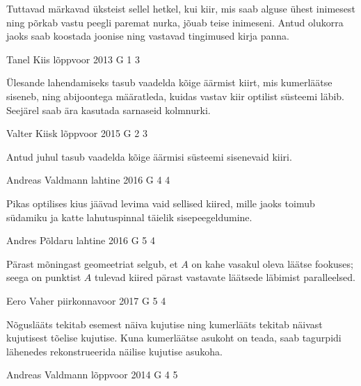 \documentclass[11pt, twoside]{article}
\begin{document}
{{\ifHint
Tuttavad märkavad üksteist sellel hetkel, kui kiir, mis saab alguse ühest inimesest ning põrkab vastu peegli paremat nurka, jõuab teise inimeseni. Antud olukorra jaoks saab koostada joonise ning vastavad tingimused kirja panna.
\fi
}

{Tanel Kiis} %
{lõppvoor} %
{2013} %
{G 1} %
{3} %
{

\ifHint
Ülesande lahendamiseks tasub vaadelda kõige äärmist kiirt, mis kumerläätse siseneb, ning abijoontega määratleda, kuidas vastav kiir optilist süsteemi läbib. Seejärel saab ära kasutada sarnaseid kolmnurki.
\fi
}

{Valter Kiisk} %
{lõppvoor} %
{2015} %
{G 2} %
{3} %
{

\ifHint
Antud juhul tasub vaadelda kõige äärmisi süsteemi sisenevaid kiiri.
\fi
}

{Andreas Valdmann} %
{lahtine} %
{2016} %
{G 4} %
{4} %
{

\ifHint
Pikas optilises kius jäävad levima vaid sellised kiired, mille jaoks toimub südamiku ja katte lahutuspinnal täielik sisepeegeldumine.
\fi
}

{Andres Põldaru} %
{lahtine} %
{2016} %
{G 5} %
{4} %
{

\ifHint
Pärast mõningast geomeetriat selgub, et $A$ on kahe vasakul oleva läätse fookuses; seega on punktist $A$ tulevad kiired pärast vastavate läätsede läbimist paralleelsed.
\fi
}

{Eero Vaher} %
{piirkonnavoor} %
{2017} %
{G 5} %
{4} %
{

\ifHint
Nõguslääts tekitab esemest näiva kujutise ning kumerlääts tekitab näivast kujutisest tõelise kujutise. Kuna kumerläätse asukoht on teada, saab tagurpidi lähenedes rekonstrueerida näilise kujutise asukoha.
\fi
}

{Andreas Valdmann} %
{lõppvoor} %
{2014} %
{G 4} %
{5} %
{

}}
\end{document}
